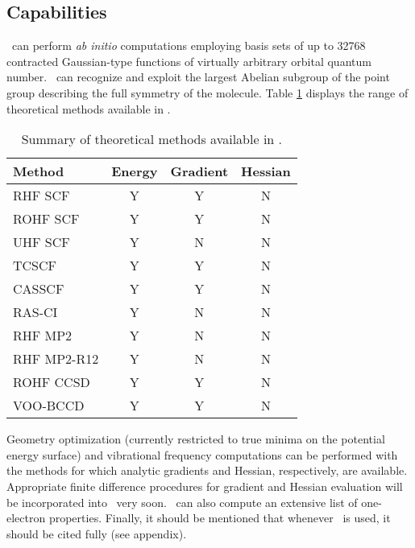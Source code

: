\subsection{Capabilities}
\PSIthree\ can perform {\em ab initio} computations employing
basis sets of up to 32768 contracted Gaussian-type functions of
virtually arbitrary orbital quantum number.
\PSIthree\ can recognize and exploit the largest Abelian subgroup of the
point group describing the full symmetry of the molecule.
Table \ref{table:methods} displays the range of theoretical
methods available in \PSIthree .
\begin{table}
\caption{Summary of theoretical methods available in \PSIthree.} \label{table:methods}
\parsep 10pt
\begin{tabular}{lccc} \hline\hline
Method & Energy & Gradient & Hessian \\ \hline
RHF SCF & Y & Y & N \\
ROHF SCF & Y & Y & N \\
UHF SCF & Y & N & N \\
TCSCF & Y & Y & N \\
CASSCF & Y & Y & N \\
RAS-CI & Y & N & N \\
RHF MP2 & Y & N & N \\
RHF MP2-R12 & Y & N & N \\
ROHF CCSD & Y & Y & N \\
VOO-BCCD & Y & Y & N \\ \hline\hline
\end{tabular}
\end{table}
Geometry optimization (currently restricted to true minima on the potential
energy surface) and vibrational frequency computations can be performed
with the methods for which analytic gradients and Hessian, respectively, are
available. Appropriate finite difference procedures for gradient and Hessian evaluation
will be incorporated into \PSIthree\ very soon.
\PSIthree\ can also compute an extensive list of one-electron properties.
Finally, it should be mentioned that whenever \PSIthree\ is used,
it should be cited fully (see appendix).

